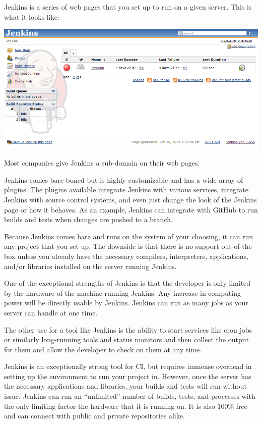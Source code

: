 \documentclass[11pt]{article}
\newenvironment{Figure}
  {\par\medskip\noindent\minipage{\linewidth}}
  {\endminipage\par\medskip}
\begin{document}
Jenkins is a series of web pages that you set up to run on a given server. This is what it looks like:
\begin{Figure}
  \centering
  \includegraphics[width=0.95\linewidth]{jenkins.png}
\end{Figure}
Most companies give Jenkins a sub-domain on their web pages.

Jenkins comes bare-boned but is highly customizable and has a wide array of plugins. The plugins available integrate Jenkins with various services, integrate Jenkins with source control systems, and even just change the look of the Jenkins page or how it behaves. As an example, Jenkins can integrate with GitHub to run builds and tests when changes are pushed to a branch.

Because Jenkins comes bare and runs on the system of your choosing, it can run any project that you set up. The downside is that there is no support out-of-the-box unless you already have the necessary compilers, interpreters, applications, and/or libraries installed on the server running Jenkins.

One of the exceptional strengths of Jenkins is that the developer is only limited by the hardware of the machine running Jenkins. Any increase in computing power will be directly usable by Jenkins. Jenkins can run as many jobs as your server can handle at one time.

The other use for a tool like Jenkins is the ability to start services like cron jobs or similarly long-running tools and status monitors and then collect the output for them and allow the developer to check on them at any time.

Jenkins is an exceptionally strong tool for CI, but requires immense overhead in setting up the environment to run your project in. However, once the server has the necessary applications and libraries, your builds and tests will run without issue. Jenkins can run an ``unlimited'' number of builds, tests, and processes with the only limiting factor the hardware that it is running on. It is also 100\% free and can connect with public and private repositories alike.
\end{document}
